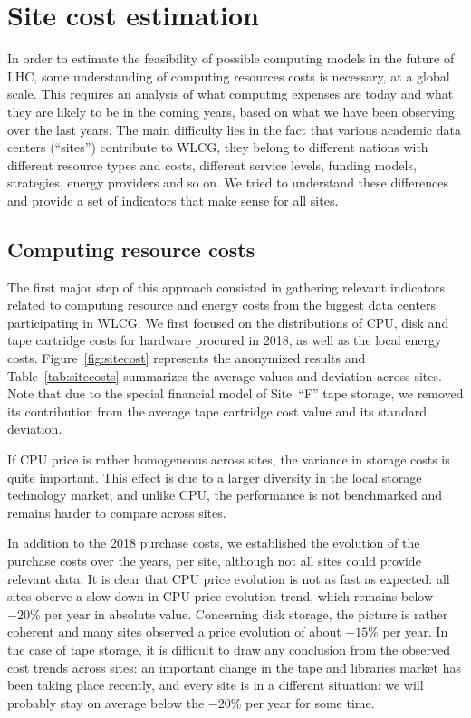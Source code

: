 \section{Site cost estimation}

In order to estimate the feasibility of possible computing models in
the future of LHC, some understanding of computing resources costs is
necessary, at a global scale.  This requires an analysis of what
computing expenses are today and what they are likely to be in the
coming years, based on what we have been observing over the last
years.  The main difficulty lies in the fact that various academic
data centers (``sites'') contribute to WLCG, they belong to different
nations with different resource types and costs, different service
levels, funding models, strategies, energy providers and so on. We
tried to understand these differences and provide a set of indicators
that make sense for all sites.

\subsection{\label{sec:sitecost:computing}Computing resource costs}
The first major step of this approach consisted in gathering relevant
indicators related to computing resource and energy costs from the
biggest data centers participating in WLCG.  We first focused on the
distributions of CPU, disk and tape cartridge costs for hardware
procured in 2018, as well as the local energy costs.
Figure~\ref{fig:sitecost} represents the anonymized results and
Table~\ref{tab:sitecosts} summarizes the average values and deviation
across sites. Note that due to the special financial model of Site~``F''
tape storage, we removed its contribution from the average tape
cartridge cost value and its standard deviation.

If CPU price is rather homogeneous across sites, the variance in
storage costs is quite important. This effect is due to a larger
diversity in the local storage technology market, and unlike CPU, the
performance is not benchmarked and remains harder to compare across
sites.

In addition to the 2018 purchase costs, we established the evolution
of the purchase costs over the years, per site, although not all sites
could provide relevant data. It is clear that CPU price evolution is
not as fast as expected: all sites oberve a slow down in CPU price
evolution trend, which remains below $-20 \%$ per year in absolute
value.  Concerning disk storage, the picture is rather coherent and
many sites observed a price evolution of about $-15 \%$ per year.  In
the case of tape storage, it is difficult to draw any conclusion from
the observed cost trends across sites: an important change in the tape
and libraries market has been taking place recently, and every site is
in a different situation: we will probably stay on average below the
$-20 \%$ per year for some time.

